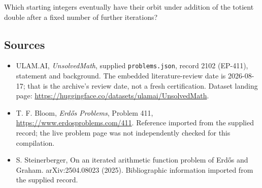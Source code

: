 \documentclass[11pt,a4paper]{article}
\begin{document}
Which starting integers eventually have their orbit under addition of the totient double after a fixed number of further iterations?

\subsection{Sources}

{\small

\begin{itemize}

\item[\hypertarget{source:2102:1}{S1}] ULAM.AI, \emph{UnsolvedMath}, supplied \texttt{problems.json}, record 2102 (EP-411), statement and background. The embedded literature-review date is 2026-08-17; that is the archive’s review date, not a fresh certification. Dataset landing page: \url{https://huggingface.co/datasets/ulamai/UnsolvedMath}.

\item[\hypertarget{source:2102:2}{S2}] T. F. Bloom, \emph{Erdős Problems}, Problem 411, \url{https://www.erdosproblems.com/411}. Reference imported from the supplied record; the live problem page was not independently checked for this compilation.

\item[\hypertarget{source:2102:3}{S3}] S. Steinerberger, On an iterated arithmetic function problem of Erd\H{o}s and Graham. arXiv:2504.08023 (2025). Bibliographic information imported from the supplied record.

\end{itemize}

}

\label{end:2102}
\end{document}

